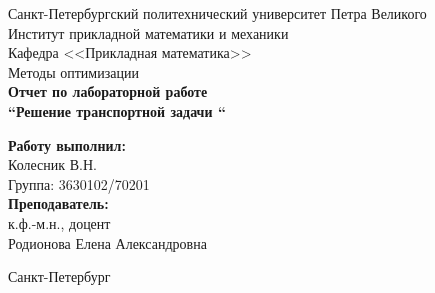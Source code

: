 \begin{titlepage}	%

	\begin{center}		%

		\large Санкт-Петербургский политехнический университет Петра Великого\\
		\large Институт прикладной математики и механики \\
		\large Кафедра <<Прикладная математика>>\\[6cm]
		
		\huge Методы оптимизации\\[0.5cm] %
		\large \textbf{Отчет по лабораторной работе \\``Решение транспортной задачи ``}\\[5.1cm]

	\end{center}


	\begin{flushright} %
		\begin{minipage}{0.25\textwidth} %
			\begin{flushleft} %

				\large\textbf{Работу выполнил:}\\
				\large Колесник В.Н.\\
				\large {Группа:} 3630102/70201\\
				
				\large \textbf{Преподаватель:}\\
				\large к.ф.-м.н., доцент\\
				\large Родионова Елена Александровна

			\end{flushleft}
		\end{minipage}
	\end{flushright}
	
	\vfill %

	\begin{center}
	\large Санкт-Петербург\\
	\large \the\year %
	\end{center} %

\end{titlepage} %

\vfill %
